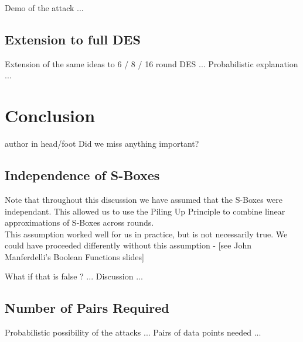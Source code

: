 \documentclass[9pt]{beamer}
\begin{document}
\begin{frame}
Demo of the attack ...

\end{frame}

\subsection{Extension to full DES}
\begin{frame}
Extension of the same ideas to 6 / 8 / 16 round DES ... Probabilistic explanation ...

\end{frame}


\section{Conclusion}
\begin{frame}
\begin{beamercolorbox}[ht=2.5ex,dp=1.125ex,center,rounded=true,shadow=true]{author in head/foot}
Did we miss anything important?
\end{beamercolorbox}
\end{frame}

\subsection{Independence of S-Boxes}
\begin{frame}
Note that throughout this discussion we have assumed that the S-Boxes were independant. This allowed us to use the Piling Up Principle to combine linear approximations of S-Boxes across rounds. \\
\vspace{3mm}
This assumption worked well for us in practice, but is not necessarily true. We could have proceeded differently without this assumption - [see John Manferdelli's Boolean Functions slides]
\end{frame}

\begin{frame}
What if that is false ? ... Discussion ...

\end{frame}

\subsection{Number of Pairs Required}
\begin{frame}
Probabilistic possibility of the attacks ... Pairs of data points needed ...

\end{frame}
\end{document}
